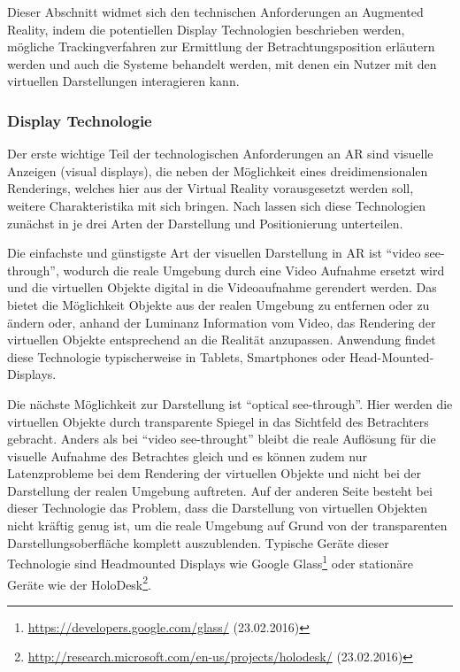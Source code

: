 Dieser Abschnitt widmet sich den technischen Anforderungen an Augmented Reality, indem die potentiellen Display Technologien beschrieben werden, mögliche Trackingverfahren zur Ermittlung der Betrachtungsposition erläutern werden und auch die Systeme behandelt werden, mit denen ein Nutzer mit den virtuellen Darstellungen interagieren kann.

\subsubsection{Display Technologie}

Der erste wichtige Teil der technologischen Anforderungen an AR sind visuelle Anzeigen (visual displays), die neben der Möglichkeit eines dreidimensionalen Renderings, welches hier aus der Virtual Reality vorausgesetzt werden soll, weitere Charakteristika mit sich bringen. Nach \citet{van2010survey} lassen sich diese Technologien zunächst in je drei Arten der Darstellung und Positionierung unterteilen.

Die einfachste und günstigste Art der visuellen Darstellung in AR ist \enquote{video see-through}, wodurch die reale Umgebung durch eine Video Aufnahme ersetzt wird und die virtuellen Objekte digital in die Videoaufnahme gerendert werden. Das bietet die Möglichkeit Objekte aus der realen Umgebung zu entfernen oder zu ändern oder, anhand der Luminanz Information vom Video, das Rendering der virtuellen Objekte entsprechend an die Realität anzupassen. Anwendung findet diese Technologie typischerweise in Tablets, Smartphones oder Head-Mounted-Displays.

Die nächste Möglichkeit zur Darstellung ist \enquote{optical see-through}. Hier werden die virtuellen Objekte durch transparente Spiegel in das Sichtfeld des Betrachters gebracht. Anders als bei \enquote{video see-throught} bleibt die reale Auflösung für die visuelle Aufnahme des Betrachtes gleich und es können zudem nur Latenzprobleme bei dem Rendering der virtuellen Objekte und nicht bei der Darstellung der realen Umgebung auftreten. Auf der anderen Seite besteht bei dieser Technologie das Problem, dass die Darstellung von virtuellen Objekten nicht kräftig genug ist, um die reale Umgebung auf Grund von der transparenten Darstellungsoberfläche komplett auszublenden. Typische Geräte dieser Technologie sind Headmounted Displays wie Google Glass\footnote{\url{https://developers.google.com/glass/} (23.02.2016)} oder stationäre Geräte wie der HoloDesk\footnote{\url{http://research.microsoft.com/en-us/projects/holodesk/} (23.02.2016)}.

